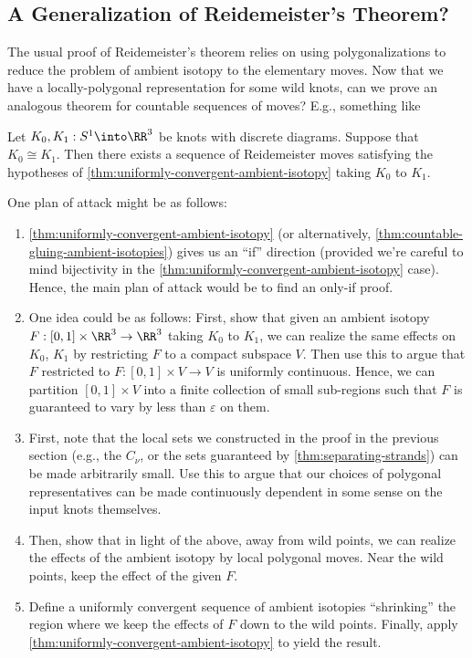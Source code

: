 \subsection{A Generalization of Reidemeister's Theorem?}
The usual proof of Reidemeister's theorem relies on using
polygonalizations to reduce the problem of ambient isotopy to the
elementary moves. Now that we have a locally-polygonal representation
for some wild knots, can we prove an analogous theorem for countable
sequences of moves? E.g., something like
\begin{conjecture}
  Let $K_0, K_1 : S^1 \into \RR^3$ be knots with discrete diagrams.
  Suppose that $K_0 \cong K_1$. Then there exists a sequence of
  Reidemeister moves satisfying the hypotheses of
  \cref{thm:uniformly-convergent-ambient-isotopy} taking $K_0$ to
  $K_1$.
\end{conjecture}
One plan of attack might be as follows:
\begin{enumerate}
  \item \cref{thm:uniformly-convergent-ambient-isotopy} (or
    alternatively, \cref{thm:countable-gluing-ambient-isotopies})
    gives us an ``if'' direction (provided we're careful to mind
    bijectivity in the
    \cref{thm:uniformly-convergent-ambient-isotopy} case). Hence,
    the main plan of attack would be to find an only-if proof.
  \item One idea could be as follows: First, show that given an
    ambient isotopy $F : [0,1] \times \RR^3 \to \RR^3$ taking
    $K_0$ to $K_1$, we can realize the same effects on $K_0$,
    $K_1$ by restricting $F$ to a compact subspace $V$. Then use
    this to argue that $F$ restricted to $F : [0,1] \times V \to
    V$ is uniformly continuous. Hence, we can partition $[0,1]
    \times V$ into a finite collection of small sub-regions such
    that $F$ is guaranteed to vary by less than $\varepsilon$ on
    them.
  \item First, note that the local sets we constructed in the
    proof in the previous section (e.g., the $C_\nu$, or the sets
    guaranteed by \cref{thm:separating-strands}) can be made
    arbitrarily small. Use this to argue that our choices of
    polygonal representatives can be made continuously dependent
    in some sense on the input knots themselves.
  \item Then, show that in light of the above, away from wild
    points, we can realize the effects of the ambient isotopy
    by local polygonal moves. Near the wild points, keep the
    effect of the given $F$.
  \item Define a uniformly convergent sequence of ambient
    isotopies ``shrinking'' the region where we keep the effects
    of $F$ down to the wild points. Finally, apply
    \cref{thm:uniformly-convergent-ambient-isotopy} to yield the
    result.
\end{enumerate}




